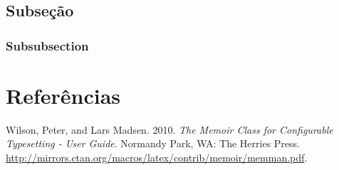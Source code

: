 \documentclass[12pt,english, french, spanish, brazil,a4paper,twoside, openright]{abntex2}	%
\begin{document}
\hypertarget{subseuxe7uxe3o}{%
\subsection{Subseção}\label{subseuxe7uxe3o}}

\hypertarget{subsubsection}{%
\subsubsection{Subsubsection}\label{subsubsection}}

\postextual

\hypertarget{referuxeancias}{%
\section*{Referências}\label{referuxeancias}}

\hypertarget{refs}{}
\leavevmode\hypertarget{ref-memoir}{}%
Wilson, Peter, and Lars Madsen. 2010. \emph{The Memoir Class for
Configurable Typesetting - User Guide}. Normandy Park, WA: The Herries
Press.
\url{http://mirrors.ctan.org/macros/latex/contrib/memoir/memman.pdf}.	%
\end{document}
